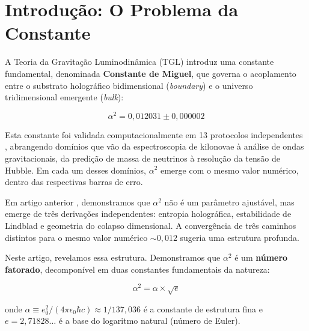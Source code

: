 \documentclass[12pt,a4paper,twoside]{article}
\newcommand{\alphaii}{\alpha^{2}}
\newcommand{\boundary}{\textit{boundary}}
\newcommand{\bulk}{\textit{bulk}}
\begin{document}
\tableofcontents
\newpage


\section{Introdução: O Problema da Constante}

A Teoria da Gravitação Luminodinâmica (TGL) \cite{Miguel2026Fronteira, Miguel2026LastString} introduz uma constante fundamental, denominada \textbf{Constante de Miguel}, que governa o acoplamento entre o substrato holográfico bidimensional (\boundary) e o universo tridimensional emergente (\bulk):

\begin{equation}
\alphaii = 0{,}012031 \pm 0{,}000002
\label{eq:alphaii_value}
\end{equation}

Esta constante foi validada computacionalmente em 13 protocolos independentes \cite{Miguel2026GitHub}, abrangendo domínios que vão da espectroscopia de kilonovae à análise de ondas gravitacionais, da predição de massa de neutrinos à resolução da tensão de Hubble. Em cada um desses domínios, $\alphaii$ emerge com o mesmo valor numérico, dentro das respectivas barras de erro.

Em artigo anterior \cite{Miguel2025Alpha2}, demonstramos que $\alphaii$ não é um parâmetro ajustável, mas emerge de três derivações independentes: entropia holográfica, estabilidade de Lindblad e geometria do colapso dimensional. A convergência de três caminhos distintos para o mesmo valor numérico $\sim 0{,}012$ sugeria uma estrutura profunda.

Neste artigo, revelamos essa estrutura. Demonstramos que $\alphaii$ é um \textbf{número fatorado}, decomponível em duas constantes fundamentais da natureza:

\begin{equationbox}[title={A Fatoração}]
\begin{equation}
\boxed{\alphaii = \alpha \times \sqrt{e}}
\label{eq:fatoracao}
\end{equation}
\end{equationbox}

\noindent onde $\alpha \equiv e_0^2 / (4\pi\epsilon_0 \hbar c) \approx 1/137{,}036$ é a constante de estrutura fina e $e = 2{,}71828\ldots$ é a base do logaritmo natural (número de Euler).
\end{document}
